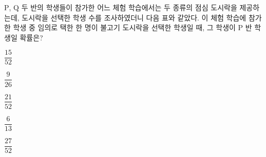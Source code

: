 $\mathrm{P}$, $\mathrm{Q}$ 두 반의 학생들이 참가한 어느 체험 학습에서는 두 종류의 점심 도시락을 제공하는데, 도시락을 선택한 학생 수를 조사하였더니 다음 표와 같았다. 이 체험 학습에 참가한 학생 중 임의로 택한 한 명이 불고기 도시락을 선택한 학생일 때, 그 학생이 $\mathrm{P}$ 반 학생일 확률은? 
\par\smallskip\begin{center}\resizebox{\ifdim\width>\linewidth\linewidth\else\width\fi}{!}{}\end{center}
\begin{choicesii}{\rule[-3ex]{0pt}{8ex}$\dfrac{15}{52}$}{\rule[-3ex]{0pt}{8ex}$\dfrac{9}{26}$}{\rule[-3ex]{0pt}{8ex}$\dfrac{21}{52}$}{\rule[-3ex]{0pt}{8ex}$\dfrac{6}{13}$}{\rule[-3ex]{0pt}{8ex}$\dfrac{27}{52}$}\end{choicesii}
